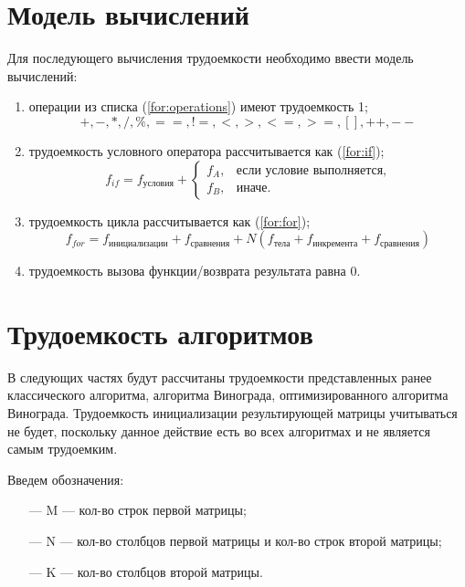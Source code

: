 \section{Модель вычислений}
Для последующего вычисления трудоемкости необходимо ввести модель вычислений:
\begin{enumerate}
	\item операции из списка (\ref{for:operations}) имеют трудоемкость 1;
	\begin{equation}
		\label{for:operations}
		+, -, *, /, \%, ==, !=, <, >, <=, >=, [], ++, {-}-
	\end{equation}
	\item трудоемкость условного оператора  рассчитывается как (\ref{for:if});
	\begin{equation}
		\label{for:if}
		f_{if} = f_{\text{условия}} +
		\begin{cases}
			f_A, & \text{если условие выполняется,}\\
			f_B, & \text{иначе.}
		\end{cases}
	\end{equation}
	\item трудоемкость цикла рассчитывается как (\ref{for:for});
	\begin{equation}
		\label{for:for}
		f_{for} = f_{\text{инициализации}} + f_{\text{сравнения}} + N(f_{\text{тела}} + f_{\text{инкремента}} + f_{\text{сравнения}})
	\end{equation}
	\item трудоемкость вызова функции/возврата результата равна 0.
\end{enumerate}

\section{Трудоемкость алгоритмов}
В следующих частях будут рассчитаны трудоемкости представленных ранее классического алгоритма, алгоритма Винограда, оптимизированного алгоритма Винограда.
Трудоемкость инициализации результирующей матрицы учитываться не будет, поскольку данное действие есть во всех алгоритмах и не является самым трудоемким.

Введем обозначения:
\begin{itemize}
	\item[---] M --- кол-во строк первой матрицы;
	\item[---] N --- кол-во столбцов первой матрицы и кол-во строк второй матрицы;
	\item[---] K --- кол-во столбцов второй матрицы.
\end{itemize}

